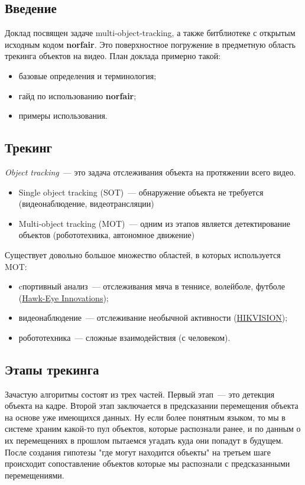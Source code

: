 
\subsection{Введение}
Доклад посвящен задаче multi-object-tracking, а также битблиотеке с открытым исходным кодом \textbf{norfair}. Это поверхностное погружение в предметную область трекинга объектов на видео. План доклада примерно такой:

\begin{itemize}
    \item базовые определения и терминология;
    \item гайд по использованию \textbf{norfair};
    \item примеры использования.
\end{itemize}

\subsection{Трекинг}
\emph{{Object tracking}}~--- это задача отслеживания объекта на протяжении всего видео.
\begin{itemize}
    \item Single object tracking (SOT)~--- обнаружение объекта не требуется (видеонаблюдение, видеотрансляции)
    \item Multi-object tracking (MOT)~--- одним из этапов является детектирование объектов (робототехника, автономное движение)
\end{itemize}

Существует довольно большое множество областей, в которых используется MOT:
\begin{itemize}
    \item cпортивный анализ~--- отслеживания мяча в теннисе, волейболе, футболе (\href{https://www.hawkeyeinnovations.com/}{Hawk-Eye Innovations});
    \item видеонаблюдение~--- отслеживание необычной активности (\href{https://www.hikvision.com/}{HIKVISION});
    \item робототехника~--- сложные взаимодействия (с человеком).
\end{itemize}

\subsection{Этапы трекинга}

Зачастую алгоритмы состоят из трех частей. Первый этап~--- это детекция объекта на кадре. Второй этап заключается в предсказании перемещения объекта на основе уже имеющихся данных. Ну если более понятным языком, то мы в системе храним какой-то пул объектов, которые распознали ранее, и по данным о их перемещениях в прошлом пытаемся угадать куда они попадут в будущем. После создания гипотезы "где могут находится объекты" на третьем шаге происходит сопоставление объектов которые мы распознали с предсказанными перемещениями.

